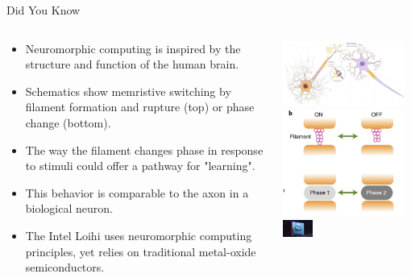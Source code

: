 \documentclass[aspectratio=169]{beamer}
\begin{document}
\begin{frame}{Did You Know}
  \begin{columns}
    \begin{column}{0.7\textwidth}
      \begin{itemize}
        \item Neuromorphic computing is inspired by the structure and function of the human brain.
        \item Schematics show memristive switching by filament formation and rupture (top) or phase change (bottom).
        \item The way the filament changes phase in response to stimuli could offer a pathway for "learning".
        \item This behavior is comparable to the axon in a biological neuron.
        \item The Intel Loihi uses neuromorphic computing principles, yet relies on traditional metal-oxide semiconductors.
      \end{itemize}
    \end{column}
    \begin{column}{0.3\textwidth}
     \begin{minipage}[t]{0.4\textwidth}
       \includegraphics[width=4cm]{media/neuron.png}
       \includegraphics[width=4cm]{media/memristor.png}
       \includegraphics[width=1cm]{media/loihi2.png}
     \end{minipage}
    \end{column}
  \end{columns}
\end{frame}
\end{document}
